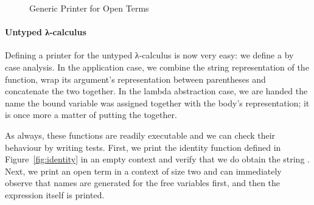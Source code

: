 \begin{figure}[h]
\caption{Generic Printer for Open Terms}\label{fig:genericprint}
\end{figure}


\paragraph{Untyped λ-calculus} Defining a printer for the untyped
λ-calculus is now very easy: we define a  by case analysis.
In the application case, we combine the string representation of the
function, wrap its argument's representation between parentheses and
concatenate the two together. In the lambda abstraction case, we are
handed the name the bound variable was assigned together with the body's
representation; it is once more a matter of putting the 
together.

\begin{agdasnippet}
\end{agdasnippet}

As always, these functions are readily executable and we can check
their behaviour by writing tests. First, we print the identity function
defined in Figure~\ref{fig:identity}
in an empty context and verify that we do obtain the string .
Next, we print an open term in a context of size two and can immediately
observe that names are generated for the free variables first, and then the
expression itself is printed.

\begin{minipage}[t]{0.45\textwidth}
  \begin{agdasnippet}
  \end{agdasnippet}
\end{minipage}
\begin{minipage}[t]{0.45\textwidth}
  \begin{agdasnippet}
  \end{agdasnippet}
\end{minipage}
